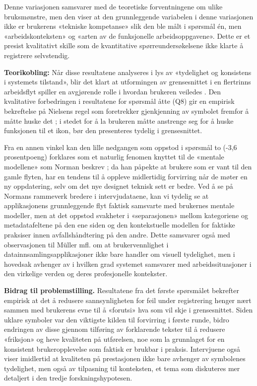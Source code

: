 Denne variasjonen samsvarer med de teoretiske forventningene om ulike bruksmønstre, men den viser at den grunnleggende variabelen i denne variasjonen ikke er brukerens «tekniske kompetanse» slik den ble målt i spørsmål én, men «arbeidskonteksten» og «arten av de funksjonelle arbeidsoppgavene». Dette er et presist kvalitativt skille som de kvantitative spørreundersøkelsene ikke klarte å registrere selvstendig.


\newline 
\textbf{Teorikobling: } Når disse resultatene analyseres i lys av «tydelighet og konsistens i systemets tilstand», blir det klart at utformingen av grensesnittet i en flertrinns arbeidsflyt spiller en avgjørende rolle i hvordan brukeren veiledes \cite{nielsen1994}. Den kvalitative forbedringen i resultatene for spørsmål åtte (Q8) gir en empirisk bekreftelse på Nielsens regel som foretrekker gjenkjenning av symbolet fremfor å måtte huske det \cite{nielsen1994}; i stedet for å la brukeren måtte anstrenge seg for å huske funksjonen til et ikon, bør den presenteres tydelig i grensesnittet.

Fra en annen vinkel kan den lille nedgangen som oppstod i spørsmål to (-3,6 prosentpoeng) forklares som et naturlig fenomen knyttet til de «mentale modellene» som Norman beskrev \cite{norman2013}; da han påpekte at brukere som er vant til den gamle flyten, har en tendens til å oppleve midlertidig forvirring når de møter en ny oppdatering, selv om det nye designet teknisk sett er bedre.
Ved å se på Normans rammeverk \cite{norman2013} bredere i intervjudataene, kan vi tydelig se at applikasjonens grunnleggende flyt faktisk samsvarte med brukernes mentale modeller, men at det oppstod svakheter i «separasjonen» mellom kategoriene og metadatafeltene på den ene siden og den kontekstuelle modellen for faktiske praksiser innen avfallshåndtering på den andre. Dette samsvarer også med observasjonen til Müller mfl. \cite{muller2024} om at brukervennlighet i datainnsamlingsapplikasjoner ikke bare handler om visuell tydelighet, men i hovedsak avhenger av i hvilken grad systemet samsvarer med arbeidssituasjoner i den virkelige verden og deres profesjonelle kontekster.

\newline
\textbf{Bidrag til problemstilling.} Resultatene fra det første spørsmålet bekrefter empirisk at det å redusere sannsynligheten for feil under registrering henger nært sammen med brukerens evne til å «forutsi» hva som vil skje i grensesnittet. Siden uklare symboler var den viktigste kilden til forvirring i første runde, bidro endringen av disse gjennom tilføring av forklarende tekster til å redusere «friksjon» og heve kvaliteten på utførelsen, noe som la grunnlaget for en konsistent brukeropplevelse som faktisk er brukbar i praksis.
Intervjuene også viser imidlertid at kvaliteten på prestasjonen ikke bare avhenger av symbolenes tydelighet, men også av tilpasning til konteksten, et tema som diskuteres mer detaljert i den tredje forskningshypotesen.

